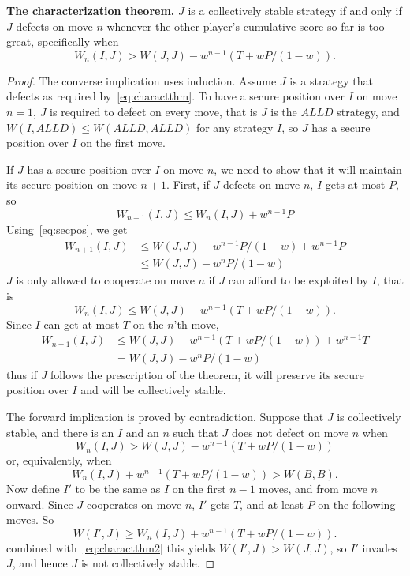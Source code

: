 \begin{theorem}\textbf{The characterization theorem.} \label{thm:charactthm}
$J$ is a collectively stable strategy if and only if $J$ defects on move $n$ whenever the other player's cumulative score so far is too great, specifically when
\begin{equation}\label{eq:charactthm}
W_n(I,J) > W(J, J) - w^{n-1}(T + wP/(1-w)).
\end{equation}
\end{theorem}
\begin{proof}
The converse implication uses induction. Assume $J$ is a strategy that defects as required by~\ref{eq:charactthm}. To have a secure position over $I$ on move $n=1$, $J$ is required to defect on every move, that is $J$ is the $ALLD$ strategy, and $W(I, ALLD) \leq W(ALLD, ALLD)$ for any strategy $I$, so $J$ has a secure position over $I$ on the first move.

If $J$ has a secure position over $I$ on move $n$, we need to show that it will maintain its secure position on move $n+1$. First, if $J$ defects on move $n$, $I$ gets at most $P$, so
\[
W_{n+1}(I, J) \leq W_n(I, J) + w^{n-1}P
\]
Using~\ref{eq:secpos}, we get
\begin{align*}
W_{n+1}(I, J) 
&\leq W(J, J) - w^{n-1}P/(1-w) + w^{n-1}P \\
&\leq W(J, J) - w^{n}P/(1-w)
\end{align*}
$J$ is only allowed to cooperate on move $n$ if $J$ can afford to be exploited by $I$, that is
\[
W_n (I, J) \leq W(J, J) - w^{n-1}(T + wP/(1-w)).
\]
Since $I$ can get at most $T$ on the $n$'th move,
\begin{align*}
W_{n+1} (I, J)
&\leq W(J, J) - w^{n-1} (T + wP/(1-w)) + w^{n-1}T \\
&= W(J, J) - w^n P / (1-w)
\end{align*}
thus if $J$ follows the prescription of the theorem, it will preserve its secure position over $I$ and will be collectively stable.

The forward implication is proved by contradiction. Suppose that $J$ is collectively stable, and there is an $I$ and an $n$ such that $J$ does not defect on move $n$ when
\[
W_n (I, J) > W(J, J) - w^{n-1}(T + wP / (1-w))
\]
or, equivalently, when
\begin{equation}\label{eq:charactthm2}
W_n (I, J) + w^{n-1}(T + wP / (1-w)) > W(B, B).
\end{equation}
Now define $I'$ to be the same as $I$ on the first $n-1$ moves, and from move $n$ onward. Since $J$ cooperates on move $n$, $I'$ gets $T$, and at least $P$ on the following moves. So
\[
W(I', J) \geq W_n (I, J) + w^{n-1}(T + wP/(1-w)).
\]
combined with~\ref{eq:charactthm2} this yields $W(I', J) > W(J, J)$, so $I'$ invades $J$, and hence $J$ is not collectively stable.
\end{proof}

